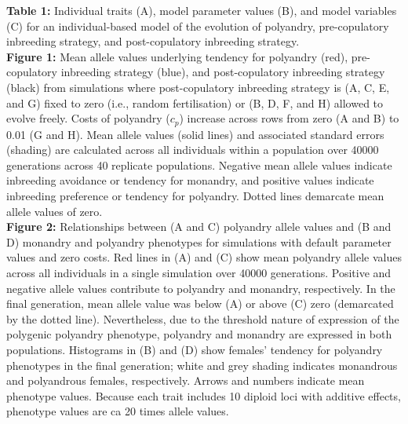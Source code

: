\documentclass[12pt]{article}
\begin{document}
\clearpage

\noindent \textbf{Table 1:} Individual traits (A), model parameter values (B), and model variables (C) for an individual-based model of the evolution of polyandry, pre-copulatory inbreeding strategy, and post-copulatory inbreeding strategy. \\

\noindent \textbf{Figure 1:} Mean allele values underlying tendency for polyandry (red), pre-copulatory inbreeding strategy (blue), and post-copulatory inbreeding strategy (black) from simulations where post-copulatory inbreeding strategy is (A, C, E, and G) fixed to zero (i.e., random fertilisation) or (B, D, F, and H) allowed to evolve freely. Costs of polyandry ($c_p$) increase across rows from zero (A and B) to 0.01 (G and H). Mean allele values (solid lines) and associated standard errors (shading) are calculated across all individuals within a population over 40000 generations across 40 replicate populations. Negative mean allele values indicate inbreeding avoidance or tendency for monandry, and positive values indicate inbreeding preference or tendency for polyandry. Dotted lines demarcate mean allele values of zero.  \\

\noindent \textbf{Figure 2:} Relationships between (A and C) polyandry allele values and (B and D) monandry and polyandry phenotypes for simulations with default parameter values and zero costs. Red lines in (A) and (C) show mean polyandry allele values across all individuals in a single simulation over 40000 generations. Positive and negative allele values contribute to polyandry and monandry, respectively. In the final generation, mean allele value was below (A) or above (C) zero (demarcated by the dotted line). Nevertheless, due to the threshold nature of expression of the polygenic polyandry phenotype, polyandry and monandry are expressed in both populations. Histograms in (B) and (D) show females' tendency for polyandry phenotypes in the final generation; white and grey shading indicates monandrous and polyandrous females, respectively. Arrows and numbers indicate mean phenotype values. Because each trait includes 10 diploid loci with additive effects, phenotype values are ca 20 times allele values. \\
\end{document}
